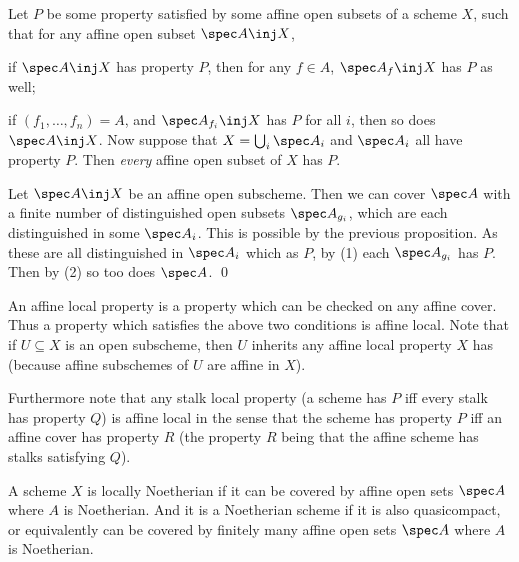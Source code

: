 \eproof

\blemm[title={Affine communication lemma}, name={affcomm}]

    Let $P$ be some property satisfied by some affine open subsets of a scheme $X$, such that for any affine open subset $\spec A\inj X$,
    \benum
        \item if $\spec A\inj X$ has property $P$, then for any $f\in A$, $\spec A_f\inj X$ has $P$ as well;
        \item if $(f_1,\dots,f_n)=A$, and $\spec A_{f_i}\inj X$ has $P$ for all $i$, then so does $\spec A\inj X$.
    \eenum
    Now suppose that $X=\bigcup_i\spec A_i$ and $\spec A_i$ all have property $P$.
    Then {\it every\/} affine open subset of $X$ has $P$.

\elemm

\bproof

    Let $\spec A\inj X$ be an affine open subscheme.
    Then we can cover $\spec A$ with a finite number of distinguished open subsets $\spec A_{g_i}$, which are each distinguished in some $\spec A_i$.
    This is possible by the previous proposition.
    As these are all distinguished in $\spec A_i$ which as $P$, by (1) each $\spec A_{g_i}$ has $P$.
    Then by (2) so too does $\spec A$.
    \qed

\eproof

\bnote

    An {\emphcolor affine local} property is a property which can be checked on any affine cover.
    Thus a property which satisfies the above two conditions is affine local.
    Note that if $U\subseteq X$ is an open subscheme, then $U$ inherits any affine local property $X$ has (because affine subschemes of $U$ are affine in $X$).

    Furthermore note that any stalk local property (a scheme has $P$ iff every stalk has property $Q$) is affine local in the sense that the scheme has property $P$
    iff an affine cover has property $R$ (the property $R$ being that the affine scheme has stalks satisfying $Q$).

\enote

\bdefn

    A scheme $X$ is {\emphcolor locally Noetherian} if it can be covered by affine open sets $\spec A$ where $A$ is Noetherian.
    And it is a {\emphcolor Noetherian scheme} if it is also quasicompact, or equivalently can be covered by finitely many affine open sets $\spec A$ where $A$ is Noetherian.

\edefn


